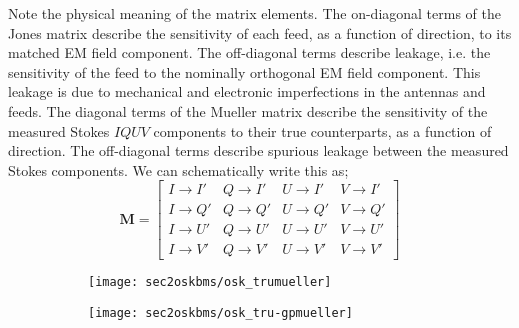 % 


Note the physical meaning of the matrix elements. The on-diagonal terms of the Jones matrix describe the sensitivity of each feed, as a function of direction, to its matched 
EM field component. The off-diagonal terms describe leakage, i.e. the sensitivity of the feed to the nominally orthogonal EM field component. This leakage is due to mechanical
and electronic imperfections in the antennas and feeds. The diagonal terms of the Mueller matrix describe the sensitivity of the measured Stokes $IQUV$ components to their true counterparts, 
as a function of direction. The off-diagonal terms describe spurious leakage between the measured Stokes components. We can schematically write this as;
$$ \bm{M}  =
\left[ \begin{array}{cccc}
  I \rightarrow I' & Q \rightarrow I' & U \rightarrow  I' & V \rightarrow  I' \\
  I \rightarrow Q' & Q \rightarrow Q' & U \rightarrow  Q' & V \rightarrow  Q'\\
  I \rightarrow U' & Q \rightarrow U' & U \rightarrow  U' & V \rightarrow  U'\\
  I \rightarrow V' & Q \rightarrow V' & U \rightarrow  V' & V \rightarrow  V'
\end{array} \right]
$$


\begin{figure}
  \centering
  \begin{minipage}[H]{\linewidth}
     \begin{subfigure}[b]{0.8\textwidth}
      \texttt{[image: sec2oskbms/osk\_trumueller]}
                \caption{}
                \label{fig:truosk1}
        \end{subfigure}
        \qquad
        \begin{subfigure}[b]{0.8\textwidth}
 \texttt{[image: sec2oskbms/osk\_tru-gpmueller]}
                \caption{}
               \label{fig:truosk2}
        \end{subfigure}
%         
\end{minipage}
  \end{figure}
  \FloatBarrier
  

